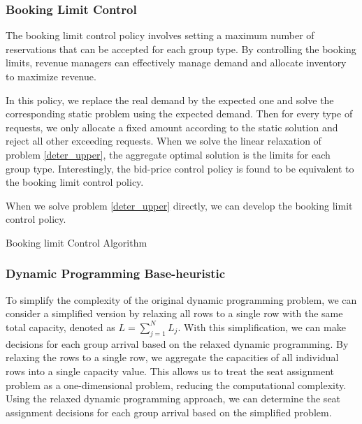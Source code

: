 \subsubsection*{Booking Limit Control}

The booking limit control policy involves setting a maximum number of reservations that can be accepted for each group type. By controlling the booking limits, revenue managers can effectively manage demand and allocate inventory to maximize revenue.

In this policy, we replace the real demand by the expected one and solve the corresponding static problem using the expected demand. Then for every type of requests, we only allocate a fixed amount according to the static solution and reject all other exceeding requests. When we solve the linear relaxation of problem \eqref{deter_upper}, the aggregate optimal solution is the limits for each group type. Interestingly, the bid-price control policy is found to be equivalent to the booking limit control policy.

When we solve problem \eqref{deter_upper} directly, we can develop the booking limit control policy.

\begin{algorithm}[H]
  \caption{Booking limit Control Algorithm}\label{algo_booking}
\end{algorithm}


\subsubsection*{Dynamic Programming Base-heuristic}
To simplify the complexity of the original dynamic programming problem, we can consider a simplified version by relaxing all rows to a single row with the same total capacity, denoted as $L = \sum_{j=1}^{N} L_j$. With this simplification, we can make decisions for each group arrival based on the relaxed dynamic programming. By relaxing the rows to a single row, we aggregate the capacities of all individual rows into a single capacity value. This allows us to treat the seat assignment problem as a one-dimensional problem, reducing the computational complexity. Using the relaxed dynamic programming approach, we can determine the seat assignment decisions for each group arrival based on the simplified problem.


